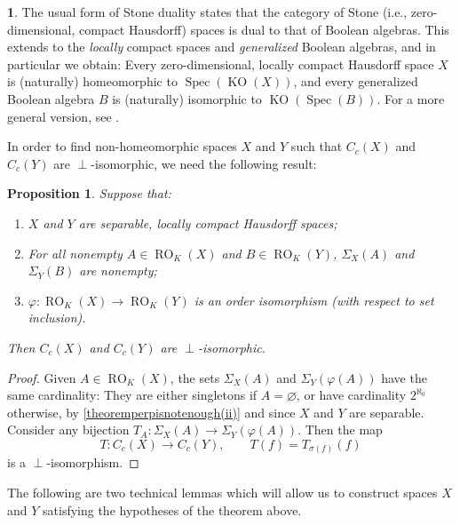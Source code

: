 \documentclass[letter,11pt]{amsart}
\theoremstyle{plain}		\newtheorem{theorem}[generalnumbering]{Theorem}
\theoremstyle{plain}		\newtheorem{corollary}[generalnumbering]{Corollary}
\theoremstyle{definition}		\newtheorem{definition}[generalnumbering]{Definition}
\theoremstyle{definition}		\newtheorem{example}[generalnumbering]{Example}
\theoremstyle{plain}		\newtheorem{proposition}[generalnumbering]{Proposition}
\theoremstyle{plain}		\newtheorem{lemma}[generalnumbering]{Lemma}
\newcommand{\namedenvironment}{}
\theoremstyle{definition}
\newtheorem*{theoremfornamed}{\namedenvironment}
\newenvironment{named}[1]{\renewcommand{\namedenvironment}{#1}\begin{theoremfornamed}}{\end{theoremfornamed}}
\begin{document}
\begin{named}{Stone duality}
	The usual form of Stone duality states that the category of Stone (i.e., zero-dimensional, compact Hausdorff) spaces is dual to that of Boolean algebras. This extends to the \emph{locally} compact spaces and \emph{generalized} Boolean algebras, and in particular we obtain: Every zero-dimensional, locally compact Hausdorff space $X$ is (naturally) homeomorphic to $\operatorname{Spec}(\operatorname{KO}(X))$, and every generalized Boolean algebra $B$ is (naturally) isomorphic to $\operatorname{KO}(\operatorname{Spec}(B))$. For a more general version, see \cite{bicestarlinglcsd}.
\end{named}

In order to find non-homeomorphic spaces $X$ and $Y$ such that $C_c(X)$ and $C_c(Y)$ are $\perp$-isomorphic, we need the following result:

\begin{proposition}\label{propositionperpisnotenough}
	Suppose that:
	\begin{enumerate}[label=(\roman*)]
		\item\label{theoremperpisnotenough(i)} $X$ and $Y$ are separable, locally compact Hausdorff spaces;
		\item\label{theoremperpisnotenough(ii)} For all nonempty $A\in\operatorname{RO}_K(X)$ and $B\in\operatorname{RO}_K(Y)$, $\Sigma_X(A)$ and $\Sigma_Y(B)$ are nonempty;
		\item\label{theoremperpisnotenough(iii)} $\varphi\colon\operatorname{RO}_K(X)\to\operatorname{RO}_K(Y)$ is an order isomorphism (with respect to set inclusion).
	\end{enumerate}
	Then $C_c(X)$ and $C_c(Y)$ are $\perp$-isomorphic.
\end{proposition}
\begin{proof}
	Given $A\in\operatorname{RO}_K(X)$, the sets  $\Sigma_X(A)$ and $\Sigma_Y(\varphi(A))$ have the same cardinality: They are either singletons if $A=\varnothing$, or have cardinality $2^{\aleph_0}$ otherwise, by \ref{theoremperpisnotenough(ii)} and since $X$ and $Y$ are separable. Consider any bijection $T_A\colon\Sigma_X(A)\to\Sigma_Y(\varphi(A))$. Then the map
	\[T\colon C_c(X)\to C_c(Y),\qquad T(f)=T_{\sigma(f)}(f)\]
	is a $\perp$-isomorphism.\qedhere
\end{proof}

The following are two technical lemmas which will allow us to construct spaces $X$ and $Y$ satisfying the hypotheses of the theorem above.
\end{document}
